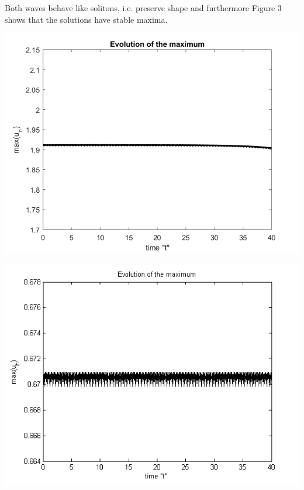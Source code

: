 \documentclass[a0,portrait]{a0poster}
\begin{document}
\begin{multicols}{2}
Both waves behave like solitons, i.e. preserve shape and furthermore Figure 3 shows that the solutions have stable maxima.
\begin{center}\vspace{0.4cm}
	\begin{minipage}[b]{0.3\linewidth}
		\includegraphics[width=\linewidth]{figures/EvolutionOfMaximum_bt3_t40.png}
	\end{minipage}	
	\begin{minipage}[b]{0.3\linewidth}
		 \includegraphics[width=\linewidth]{figures/EvolutionOfMaximum.png}
	\end{minipage}
\end{center}


\end{multicols}
\end{document}
